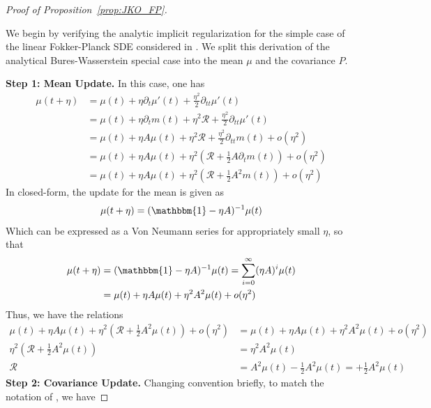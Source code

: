 \documentclass[reqno,11pt,letterpaper]{amsart}
\theoremstyle{plain}
\theoremstyle{definition}
\theoremstyle{remark}
\begin{document}
\begin{proof}[Proof of Proposition~\ref{prop:JKO_FP}]\label{proof:JKO_BW_analytic}

We begin by verifying the analytic implicit regularization for the simple case of the linear Fokker-Planck SDE considered in \cite{Halder2017}. We split this derivation of the analytical Bures-Wasserstein special case into the mean $\mu$ and the covariance $P$.

\textbf{Step 1: Mean Update.} In this case, one has
\begin{align*}
    \mu(t + \eta) &= \mu(t) + \eta \partial_{t} \mu'(t) + \frac{\eta^{2}}{2} \partial_{tt} \mu'(t)\\
    &= \mu(t) + \eta \partial_{t} m(t) + \eta^{2} \mathcal{R} + \frac{\eta^{2}}{2} \partial_{tt} \mu'(t) \\
    &= \mu(t) + \eta A \mu(t) + \eta^{2} \mathcal{R} + \frac{\eta^{2}}{2} \partial_{tt} m(t) + o(\eta^{2})\\
    &= \mu(t) + \eta A \mu(t) + \eta^{2} \left( \mathcal{R} + \frac{1}{2} A \partial_{t}m(t) \right) + o(\eta^{2}) \\
    &= \mu(t) + \eta A \mu(t) + \eta^{2} \left( \mathcal{R} + \frac{1}{2} A^{2} m(t) \right) + o(\eta^{2})
\end{align*}
In closed-form, the update for the mean is given as
\begin{align*}
    \mu(t + \eta) = (\mathbbm{1} - \eta A )^{-1} \mu(t)
\end{align*}
Which can be expressed as a Von Neumann series for appropriately small $\eta$, so that
\begin{align*}
    \mu(t + \eta) &= (\mathbbm{1} - \eta A )^{-1} \mu(t) = \sum_{i=0}^{\infty} (\eta A)^{i} \mu(t) \\
    &= \mu(t) + \eta A \mu(t) + \eta^{2} A^{2} \mu(t) + o(\eta^{2})
\end{align*}
Thus, we have the relations
\begin{align*}
    \mu(t) + \eta A \mu(t) + \eta^{2} \left( \mathcal{R} + \frac{1}{2} A^{2} \mu(t) \right) + o(\eta^{2})
    &= \mu(t) + \eta A \mu(t) + \eta^{2} A^{2} \mu(t) + o(\eta^{2}) \\
     \eta^{2} \left( \mathcal{R} + \frac{1}{2} A^{2} \mu(t) \right) &=  \eta^{2} A^{2} \mu(t) \\
      \mathcal{R} &= A^{2} \mu(t) - \frac{1}{2} A^{2} \mu(t) = +\frac{1}{2} A^{2} \mu(t)
\end{align*}
\textbf{Step 2: Covariance Update.} Changing convention briefly, to match the notation of \cite{Halder2017}, we have

\end{proof}
\end{document}

